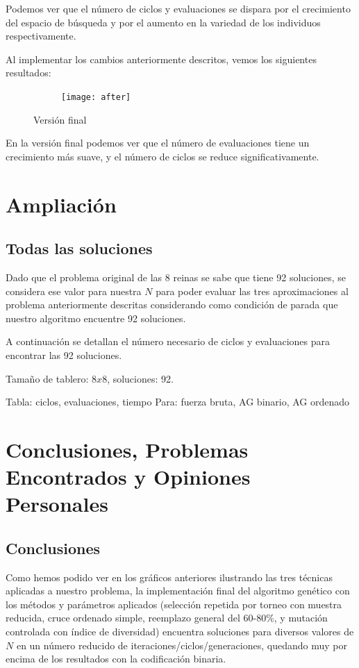 \documentclass[12pt]{article}
\begin{document}
Podemos ver que el número de ciclos y evaluaciones se dispara por el crecimiento del espacio de búsqueda y por el aumento en la variedad de los individuos respectivamente.

Al implementar los cambios anteriormente descritos, vemos los siguientes resultados:

\begin{figure}[h]
    \center
    \begin{subfigure}{.85\textwidth}
        \texttt{[image: after]}
    \end{subfigure}
    \caption{Versión final}
\end{figure}

En la versión final podemos ver que el número de evaluaciones tiene un crecimiento más suave, y el número de ciclos se reduce significativamente.

\section{Ampliación}

\subsection{Todas las soluciones}

Dado que el problema original de las 8 reinas se sabe que tiene 92 soluciones, se considera ese valor para nuestra $N$ para poder evaluar las tres aproximaciones al problema anteriormente descritas considerando como condición de parada que nuestro algoritmo encuentre 92 soluciones.

A continuación se detallan el número necesario de ciclos y evaluaciones para encontrar las 92 soluciones.

Tamaño de tablero: $8x8$, soluciones: 92.

Tabla: ciclos, evaluaciones, tiempo
Para: fuerza bruta, AG binario, AG ordenado

\section{Conclusiones, Problemas Encontrados y Opiniones Personales}

\subsection{Conclusiones}

Como hemos podido ver en los gráficos anteriores ilustrando las tres técnicas aplicadas a nuestro problema, la implementación final del algoritmo genético con los métodos y parámetros aplicados (selección repetida por torneo con muestra reducida, cruce ordenado simple, reemplazo general del 60-80\%, y mutación controlada con índice de diversidad) encuentra soluciones para diversos valores de $N$ en un número reducido de iteraciones/ciclos/generaciones, quedando muy por encima de los resultados con la codificación binaria.
\end{document}
